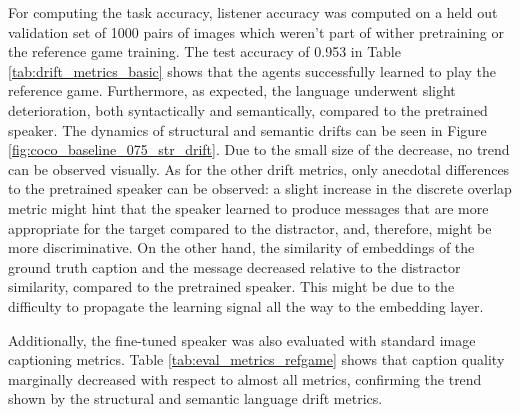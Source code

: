 For computing the task accuracy, listener accuracy was computed on a held out validation set of 1000 pairs of images which weren't part of wither pretraining or the reference game training. The test accuracy of 0.953 in Table \ref{tab:drift_metrics_basic} shows that the agents successfully learned to play the reference game. Furthermore, as expected, the language underwent slight deterioration, both syntactically and semantically, compared to the pretrained speaker. The dynamics of structural and semantic drifts can be seen in Figure \ref{fig:coco_baseline_075_str_drift}. Due to the small size of the decrease, no trend can be observed visually.
As for the other drift metrics, only anecdotal differences to the pretrained speaker can be observed: a slight increase in the discrete overlap metric might hint that the speaker learned to produce messages that are more appropriate for the target compared to the distractor, and, therefore, might be more discriminative. On the other hand, the similarity of embeddings of the ground truth caption and the message decreased relative to the distractor similarity, compared to the pretrained speaker. This might be due to the difficulty to propagate the learning signal all the way to the embedding layer.


Additionally, the fine-tuned speaker was also evaluated with standard image captioning metrics. Table \ref{tab:eval_metrics_refgame} shows that caption quality marginally decreased with respect to almost all metrics, confirming the trend shown by the structural and semantic language drift metrics.

